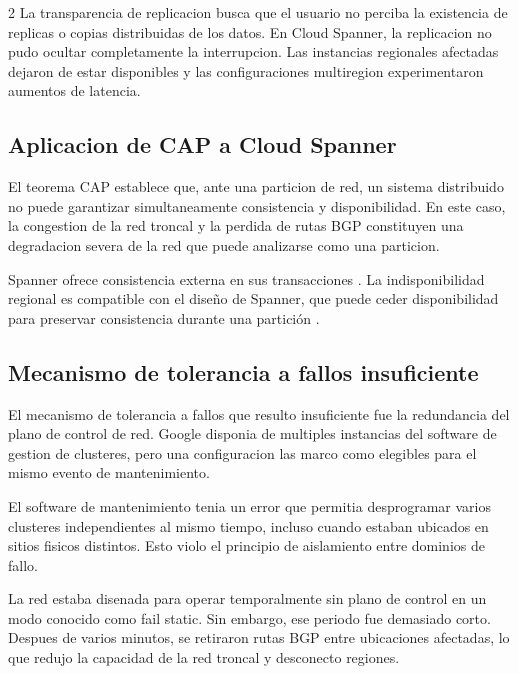 \documentclass[10pt]{article}
\begin{document}
\begin{multicols}{2}
La transparencia de replicacion busca que el usuario no perciba la existencia de replicas o
copias distribuidas de los datos. En Cloud Spanner, la replicacion no pudo ocultar
completamente la interrupcion. Las instancias regionales afectadas dejaron de estar
disponibles y las configuraciones multiregion experimentaron aumentos de latencia.
\cite{googlecloud19009}

\subsection{Aplicacion de CAP a Cloud Spanner}

El teorema CAP establece que, ante una particion de red, un sistema distribuido no puede
garantizar simultaneamente consistencia y disponibilidad. En este caso, la congestion de la
red troncal y la perdida de rutas BGP constituyen una degradacion severa de la red que puede
analizarse como una particion. \cite{googlecloud19009}



Spanner ofrece consistencia externa en sus transacciones \cite{corbett2013spanner}. La indisponibilidad regional es compatible con el diseño de Spanner, que puede ceder disponibilidad para preservar consistencia durante una partición \cite{googlecloud19009,brewer2017}.

\subsection{Mecanismo de tolerancia a fallos insuficiente}

El mecanismo de tolerancia a fallos que resulto insuficiente fue la redundancia del plano de
control de red. Google disponia de multiples instancias del software de gestion de clusteres,
pero una configuracion las marco como elegibles para el mismo evento de mantenimiento.
\cite{googlecloud19009}

El software de mantenimiento tenia un error que permitia desprogramar varios clusteres
independientes al mismo tiempo, incluso cuando estaban ubicados en sitios fisicos distintos.
Esto violo el principio de aislamiento entre dominios de fallo. \cite{googlecloud19009}

La red estaba disenada para operar temporalmente sin plano de control en un modo conocido como
fail static. Sin embargo, ese periodo fue demasiado corto. Despues de varios minutos, se
retiraron rutas BGP entre ubicaciones afectadas, lo que redujo la capacidad de la red troncal
y desconecto regiones. \cite{googlecloud19009}


\end{multicols}
\end{document}
